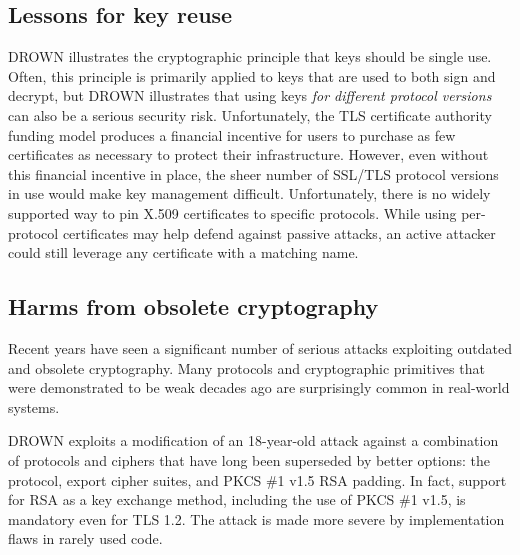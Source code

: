 \subsection{Lessons for key reuse}

DROWN illustrates the cryptographic principle that keys should be single use.
Often, this principle is primarily applied to keys that are used to both sign
and decrypt, but DROWN illustrates that using keys \emph{for different protocol
versions} can also be a serious security risk.
Unfortunately, the TLS certificate authority funding model produces a financial incentive for users to purchase as few certificates as necessary to protect their infrastructure.  However, even without this financial incentive in place, the sheer number of SSL/TLS protocol versions in use would make key management difficult.
\fi
Unfortunately, there is no widely supported way to pin X.509 certificates to specific
protocols. While using per-protocol certificates may help defend against
passive attacks, an active attacker could still leverage any certificate with a
matching name.

\subsection{Harms from obsolete cryptography}

Recent years have seen a significant number of serious attacks exploiting
outdated and obsolete cryptography. Many protocols and cryptographic primitives
that were demonstrated to be weak decades ago are surprisingly common in
real-world systems.


DROWN exploits a modification of an 18-year-old attack against a combination of protocols and ciphers that have long been superseded by better options: the \ssltwo protocol, export cipher suites, and PKCS \#1 v1.5 RSA padding. In fact, support for RSA as a key exchange method, including the use of PKCS \#1 v1.5, is mandatory even for TLS 1.2. The attack is made more severe by implementation flaws in rarely used code.

